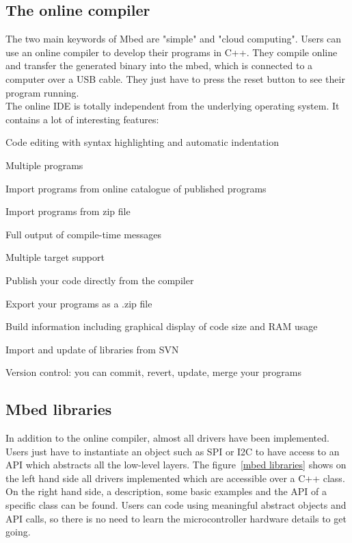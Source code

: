 \documentclass[pdftex,10pt,a4paper]{report}
\newenvironment{packed_item}{
\begin{itemize}
  \setlength{\itemsep}{1pt}
  \setlength{\parskip}{0pt}
  \setlength{\parsep}{0pt}
}{\end{itemize}}
\begin{document}
\subsection{The online compiler}
The two main keywords of Mbed are "simple" and "cloud computing". Users can use an online compiler to develop their programs in C++. They compile online and transfer the generated binary into the mbed, which is connected to a computer over a USB cable. They just have to press the reset button to see their program running.
\\

The online IDE is totally independent from the underlying operating system. It contains a lot of interesting features:
\begin{packed_item}
	\item Code editing with syntax highlighting and automatic indentation
	\item Multiple programs
	\item Import programs from online catalogue of published programs
	\item Import programs from zip file
	\item Full output of compile-time messages
	\item Multiple target support
	\item Publish your code directly from the compiler
	\item Export your programs as a .zip file
	\item Build information including graphical display of code size and RAM usage
	\item Import and update of libraries from SVN
	\item Version control: you can commit, revert, update, merge your programs
\end{packed_item}

\subsection{Mbed libraries}
In addition to the online compiler, almost all drivers have been implemented. Users just have to instantiate an object such as SPI or I2C to have access to an API which abstracts all the low-level layers. The figure~\ref{mbed libraries} shows on the left hand side all drivers implemented which are accessible over a C++ class. On the right hand side, a description, some basic examples and the API of a specific class can be found. Users can code using meaningful abstract objects and API calls, so there is no need to learn the microcontroller hardware details to get going.\\
\end{document}

